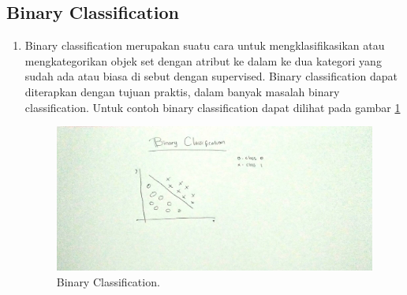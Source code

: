 \subsection{Binary Classification}
\begin{enumerate}
\item Binary classification merupakan suatu cara untuk mengklasifikasikan atau mengkategorikan objek set dengan atribut ke dalam ke dua kategori yang sudah ada atau biasa di sebut dengan supervised. Binary classification dapat diterapkan dengan tujuan praktis, dalam banyak masalah binary classification. Untuk contoh binary classification dapat dilihat pada gambar \ref{bc}
		\begin{figure}[ht]
		\centerline{\includegraphics[width=1\textwidth]{figures/im/im11.jpg}}
		\caption{Binary Classification.}
		\label{bc}
		\end{figure}
\end{enumerate}

